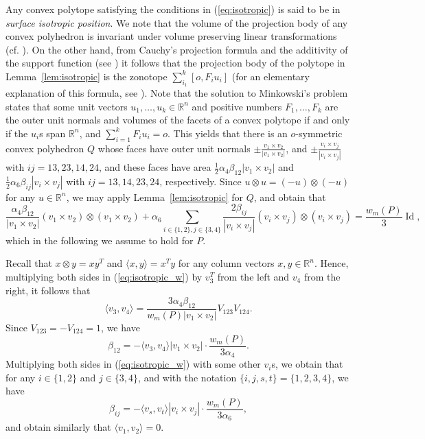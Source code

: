 \documentclass[twoside]{amsart}
\theoremstyle{definition}
\renewcommand{\Re}{\mathbb R}
\DeclareMathOperator{\Id}{Id}
\begin{document}
Any convex polytope satisfying the conditions in (\ref{eq:isotropic}) is said to be in \emph{surface isotropic position}.
We note that the volume of the projection body of any convex polyhedron is invariant under volume preserving linear transformations (cf. \cite{Petty2}).
On the other hand, from Cauchy's projection formula and the additivity of the support function (see \cite{Gardner}) it follows that the projection body of the polytope in Lemma~\ref{lem:isotropic} is the zonotope $\sum_{i_1}^k [o,F_i u_i]$ (for an elementary explanation of this formula, see \cite[Theorem 1.1]{BGK}). Note that the solution to Minkowski's problem \cite[Theorem 8.2.2]{Schneider} states that some unit vectors $u_1, \ldots, u_k \in \Re^n$ and positive numbers $F_1, \ldots, F_k$ are the outer unit normals and volumes of the facets of a convex polytope if and only if the $u_i$s span $\Re^n$, and $\sum_{i=1}^k F_i u_i = o$. This yields that there is an $o$-symmetric convex polyhedron $Q$ whose faces have outer unit normals $\pm \frac{v_1 \times v_2}{|v_1 \times v_2|}$, and $\pm \frac{v_i \times v_j}{|v_i \times v_j|}$ with $ij=13,23,14,24$, and these faces have area $\frac{1}{2} \alpha_4 \beta_{12} | v_1 \times v_2|$ and $\frac{1}{2} \alpha_6 \beta_{ij} |v_i \times v_j|$ with $ij=13,14,23,24$, respectively.
Since $u \otimes u = (-u) \otimes (-u)$ for any $u \in \Re^n$, we may apply Lemma~\ref{lem:isotropic} for $Q$, and obtain that
\begin{equation}\label{eq:isotropic_w}
\frac{\alpha_4 \beta_{12}}{|v_1 \times v_2|} (v_1 \times v_2) \otimes (v_1 \times v_2) + \alpha_6 \sum_{i \in \{1,2 \}, j \in \{ 3,4 \} } \frac{2\beta_{ij}}{|v_i \times v_j|} (v_i \times v_j) \otimes (v_i \times v_j) = \frac{w_m(P)}{3} \Id,
\end{equation}
which in the following we assume to hold for $P$.

Recall that $x \otimes y = x y^T$ and $\langle x,y \rangle = x^T y$ for any column vectors $x,y \in \Re^n$.
Hence, multiplying both sides in (\ref{eq:isotropic_w}) by $v_3^T$ from the left and $v_4$ from the right, it follows that
\[
\langle v_3, v_4 \rangle = \frac{3 \alpha_4 \beta_{12}}{w_m(P) |v_1 \times v_2|} V_{123} V_{124}.
\]
Since $V_{123} = - V_{124} = 1$, we have
\[
\beta_{12} = - \langle v_3,v_4 \rangle |v_1 \times v_2| \cdot \frac{w_m(P)}{3 \alpha_4}.
\]
Multiplying both sides in (\ref{eq:isotropic_w}) with some other $v_i$s, we obtain that 
for any $i \in \{ 1,2\}$ and $j \in \{ 3,4 \}$, and with the notation $\{ i,j,s,t \} = \{ 1,2,3,4\}$, we have
\[
\beta_{ij} = - \langle v_s,v_t \rangle |v_i \times v_j| \cdot \frac{w_m(P)}{3 \alpha_6},
\]
and obtain similarly that $\langle v_1, v_2 \rangle = 0$.
 
\end{document}
